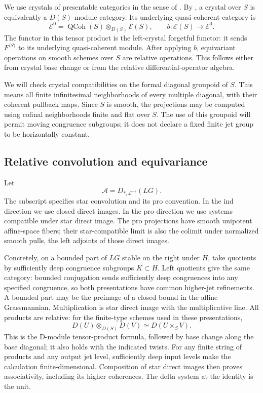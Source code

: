\documentclass[11pt]{article}
\numberwithin{equation}{section}
\theoremstyle{definition}
\theoremstyle{remark}
\begin{document}
We use crystals of presentable categories in the sense of
\cite[Section~2 and Appendix~B, especially Sections~B.3.8--B.3.11
and~B.14]{GLCII}.  By
\cite[Theorem~2.6.3]{Gaitsgory1Affine}, a crystal over $S$ is equivalently
a $D(S)$-module category.  Its underlying quasi-coherent category is
\[
 \mathcal E^0=\operatorname{QCoh}(S)
                   \otimes_{D(S)}\mathcal E(S),
 \qquad b:\mathcal E(S)\longrightarrow\mathcal E^0.
\]
The functor in this tensor product is the left-crystal forgetful functor:
it sends $F^{\langle S\rangle}$ to its underlying quasi-coherent module.
After applying $b$, equivariant operations on smooth schemes over $S$
are relative operations.  This follows either from crystal base change
or from the relative differential-operator algebra.

We will check crystal compatibilities on the formal diagonal groupoid
of $S$.  This means all finite infinitesimal neighborhoods of every
multiple diagonal, with their coherent pullback maps.  Since $S$ is
smooth, the projections may be computed using cofinal neighborhoods
finite and flat over $S$.  The use of this groupoid will permit moving
congruence subgroups; it does not declare a fixed finite jet group to
be horizontally constant.

\subsection{Relative convolution and equivariance}

Let
\[
                     \mathcal A=D_{*,\mathcal L^{-s}}(LG).
\]
The subscript specifies star convolution and its pro convention.
In the ind direction we use closed direct images.  In the pro direction
we use systems compatible under star direct image.  The pro projections
have smooth unipotent affine-space fibers; their star-compatible limit
is also the colimit under normalized smooth pulls, the left adjoints of
those direct images.

Concretely, on a bounded part of $LG$ stable on the right under $H$, take
quotients by sufficiently deep congruence subgroups $K\subset H$.  Left
quotients give the same category: bounded conjugation sends sufficiently
deep congruences into any specified congruence, so both presentations
have common higher-jet refinements.  A bounded part may be the preimage
of a closed bound in the affine Grassmannian.  Multiplication is star
direct image with the multiplicative line.  All products are relative:
for the finite-type schemes used in these presentations,
\[
                 D(U)\otimes_{D(S)}D(V)
                       \simeq D(U\times_S V).
\]
This is the D-module tensor-product formula, followed by base change
along the base diagonal; it also holds with the indicated twists.
For any finite string of products and any output jet level, sufficiently
deep input levels make the calculation finite-dimensional.  Composition
of star direct images then proves associativity, including its higher
coherences.  The delta system at the identity is the unit.
\end{document}
